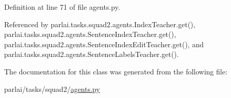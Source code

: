 Definition at line 71 of file agents.\+py.



Referenced by parlai.\+tasks.\+squad2.\+agents.\+Index\+Teacher.\+get(), parlai.\+tasks.\+squad2.\+agents.\+Sentence\+Index\+Teacher.\+get(), parlai.\+tasks.\+squad2.\+agents.\+Sentence\+Index\+Edit\+Teacher.\+get(), and parlai.\+tasks.\+squad2.\+agents.\+Sentence\+Labels\+Teacher.\+get().



The documentation for this class was generated from the following file\+:\begin{DoxyCompactItemize}
\item 
parlai/tasks/squad2/\hyperlink{parlai_2tasks_2squad2_2agents_8py}{agents.\+py}\end{DoxyCompactItemize}
